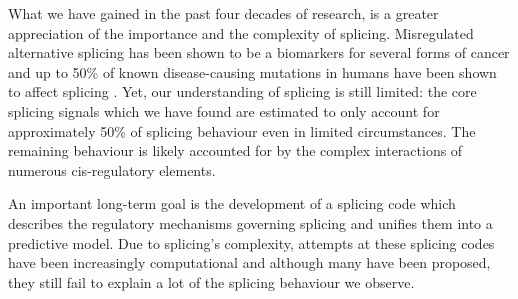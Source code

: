What we have gained in the past four decades of research, is a greater appreciation of the importance and the complexity of splicing. 
Misregulated alternative splicing has been shown to be a biomarkers for several forms of cancer \cite{cancer} \cite{splicingcausescancer} and up to 50\% of known disease-causing mutations in humans have been shown to affect splicing \cite{50diseasessplicing}. 
Yet, our understanding of splicing is still limited: the core splicing signals which we have found are estimated to only account for approximately 50\% of splicing behaviour even in limited circumstances. The remaining behaviour is likely accounted for by the complex interactions of numerous cis-regulatory elements. 

An important long-term goal is the development of a splicing code which describes the regulatory mechanisms governing splicing \cite{longtermcall} and unifies them into a predictive model. Due to splicing's complexity, attempts at these splicing codes have been increasingly computational \cite{barash2010a} and although many have been proposed, they still fail to explain a lot of the splicing behaviour we observe. %



%
%









